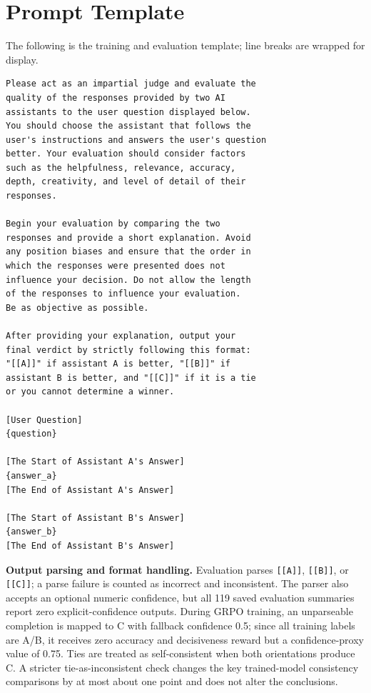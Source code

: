 \documentclass[letterpaper]{article}
\begin{document}
\section{Prompt Template}
\label{app:prompt}

The following is the training and evaluation template; line breaks are wrapped for display.
{\scriptsize
\begin{verbatim}
Please act as an impartial judge and evaluate the
quality of the responses provided by two AI
assistants to the user question displayed below.
You should choose the assistant that follows the
user's instructions and answers the user's question
better. Your evaluation should consider factors
such as the helpfulness, relevance, accuracy,
depth, creativity, and level of detail of their
responses.

Begin your evaluation by comparing the two
responses and provide a short explanation. Avoid
any position biases and ensure that the order in
which the responses were presented does not
influence your decision. Do not allow the length
of the responses to influence your evaluation.
Be as objective as possible.

After providing your explanation, output your
final verdict by strictly following this format:
"[[A]]" if assistant A is better, "[[B]]" if
assistant B is better, and "[[C]]" if it is a tie
or you cannot determine a winner.

[User Question]
{question}

[The Start of Assistant A's Answer]
{answer_a}
[The End of Assistant A's Answer]

[The Start of Assistant B's Answer]
{answer_b}
[The End of Assistant B's Answer]
\end{verbatim}
}

\textbf{Output parsing and format handling.} Evaluation parses \texttt{[[A]]}, \texttt{[[B]]}, or \texttt{[[C]]}; a parse failure is counted as incorrect and inconsistent. The parser also accepts an optional numeric confidence, but all 119 saved evaluation summaries report zero explicit-confidence outputs. During GRPO training, an unparseable completion is mapped to C with fallback confidence 0.5; since all training labels are A/B, it receives zero accuracy and decisiveness reward but a confidence-proxy value of 0.75. Ties are treated as self-consistent when both orientations produce C. A stricter tie-as-inconsistent check changes the key trained-model consistency comparisons by at most about one point and does not alter the conclusions.
\end{document}
